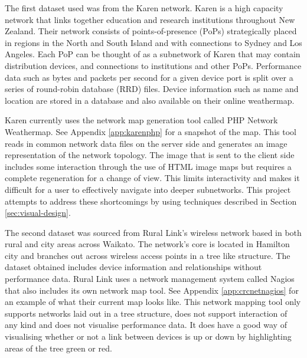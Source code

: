 \documentclass{article}
\begin{document}
The first dataset used was from the Karen network. \cite{Karen_website} Karen is
a high capacity network that links together education and research institutions
throughout New Zealand. Their network consists of points-of-presence (PoPs)
strategically placed in regions in the North and South Island and with
connections to Sydney and Los Angeles. Each PoP can be thought of as a
subnetwork of Karen that may contain distribution devices, and connections to
institutions and other PoPs.  Performance data such as bytes and packets per
second for a given device port is split over a series of round-robin database
(RRD) files. Device information such as name and location are stored in a
database and also available on their online weathermap.

Karen currently uses the network map generation tool called PHP Network
Weathermap. \cite{PHP_Network_Weathermap_website} See Appendix
\ref{app:karenphp} for a snapshot of the map. This tool reads in common network
data files on the server side and generates an image representation of the
network topology. The image that is sent to the client side includes some
interaction through the use of HTML image maps but requires a complete
regeneration for a change of view. This limits interactivity and makes it
difficult for a user to effectively navigate into deeper subnetworks. This
project attempts to address these shortcomings by using techniques described in
Section \ref{sec:visual-design}. 

The second dataset was sourced from Rural Link's wireless network based in both
rural and city areas across Waikato. The network's core is located in Hamilton
city and branches out across wireless access points in a tree like structure.
The dataset obtained includes device information and relationships without
performance data. Rural Link uses a network management system called Nagios that
also includes its own network map tool. \cite{Nagio_website} See Appendix
\ref{app:crcnetnagios} for an example of what their current map looks like. This
network mapping tool only supports networks laid out in a tree structure, does
not support interaction of any kind and does not visualise performance data. It
does have a good way of visualising whether or not a link between devices is up
or down by highlighting areas of the tree green or red. 
\end{document}
